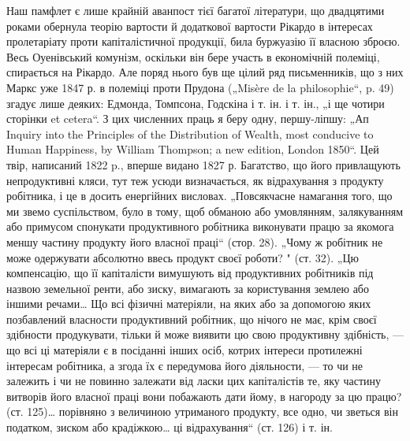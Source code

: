 Наш памфлет є лише крайній аванпост тієї багатої літератури, що
двадцятими роками обернула теорію вартости й додаткової вартости
Рікардо в інтересах пролетаріату проти капіталістичної продукції, била
буржуазію її власною зброєю. Весь Оуенівський комунізм, оскільки він
бере участь в економічній полеміці, спирається на Рікардо. Але поряд
нього був ще цілий ряд письменників, що з них Маркс уже 1847 р. в
полеміці проти Прудона („Misère de la philosophie“, p. 49) згадує лише деяких:
Едмонда, Томпсона, Годскіна і т. ін. і т. ін., „і ще чотири сторінки et
cetera“. З цих численних праць я беру одну, першу-ліпшу: „Ап Inquiry
into the Principles of the Distribution of Wealth, most conducive to Human
Happiness, by William Thompson; a new edition, London 1850“. Цей твір,
написаний 1822 p., вперше видано 1827 р. Багатство, що його привлащують
непродуктивні кляси, тут теж усюди визначається, як відрахування з
продукту робітника, і це в досить енергійних висловах. „Повсякчасне
намагання того, що ми звемо суспільством, було в тому, щоб обманою
або умовлянням, залякуванням або примусом спонукати продуктивного
робітника виконувати працю за якомога меншу частину продукту його
власної праці“ (стор. 28). „Чому ж робітник не може одержувати абсолютно
ввесь продукт своєї роботи? " (ст. 32). „Цю компенсацію, що її
капіталісти вимушують від продуктивних робітників під назвою земельної
ренти, або зиску, вимагають за користування землею або іншими речами\dots{}
Що всі фізичні матеріяли, на яких або за допомогою яких позбавлений
власности продуктивний робітник, що нічого не має, крім своєї здібности
продукувати, тільки й може виявити цю свою продуктивну здібність, —
що всі ці матеріяли є в посіданні інших осіб, котрих інтереси протилежні
інтересам робітника, а згода їх є передумова його діяльности, — то чи не
залежить і чи не повинно залежати від ласки цих капіталістів те, яку
частину витворів його власної праці вони побажають дати йому, в
нагороду за цю працю? (ст. 125)\dots{} порівняно з величиною утриманого
продукту, все одно, чи зветься він податком, зиском або крадіжкою\dots{}
ці відрахування“ (ст. 126) і т. ін.
